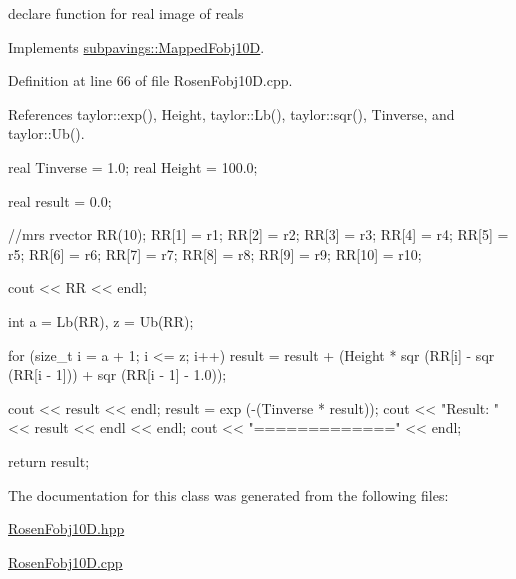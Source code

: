 declare function for real image of reals 



\-Implements \hyperlink{classsubpavings_1_1MappedFobj10D_ac9bb2848cd33f3fd5d9b934daaf60613}{subpavings\-::\-Mapped\-Fobj10\-D}.



\-Definition at line 66 of file \-Rosen\-Fobj10\-D.\-cpp.



\-References taylor\-::exp(), \-Height, taylor\-::\-Lb(), taylor\-::sqr(), \-Tinverse, and taylor\-::\-Ub().


\begin{DoxyCode}
{   
   real Tinverse = 1.0;
  real Height = 100.0;

  real result = 0.0;
  
  //mrs
  rvector RR(10);
  RR[1] = r1;
  RR[2] = r2;
  RR[3] = r3;
  RR[4] = r4;
  RR[5] = r5;
  RR[6] = r6;
  RR[7] = r7;
  RR[8] = r8;
  RR[9] = r9;
  RR[10] = r10;
  
  cout << RR << endl;
  
  int a = Lb(RR), z = Ub(RR);
  
    for (size_t i = a + 1; i <= z; i++)
    {
      result = result + (Height * sqr (RR[i] - sqr (RR[i - 1])) +
        sqr (RR[i - 1] - 1.0));
    }
 
  cout << result << endl;
  result = exp (-(Tinverse * result));
  cout << "Result: " << result << endl << endl;
  cout << "=============" << endl;
  
  return result;
}
\end{DoxyCode}


\-The documentation for this class was generated from the following files\-:\begin{DoxyCompactItemize}
\item 
\hyperlink{RosenFobj10D_8hpp}{\-Rosen\-Fobj10\-D.\-hpp}\item 
\hyperlink{RosenFobj10D_8cpp}{\-Rosen\-Fobj10\-D.\-cpp}\end{DoxyCompactItemize}
